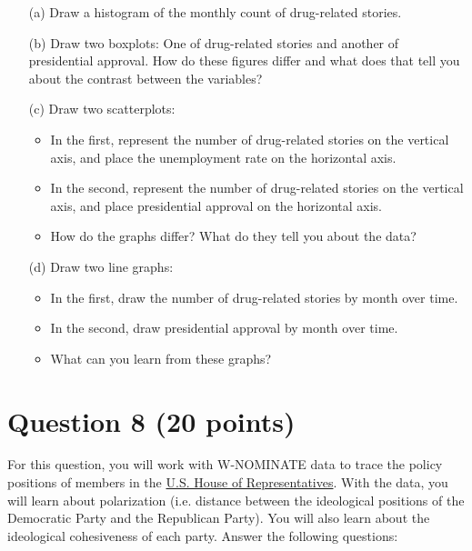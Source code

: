 \documentclass[12pt,letterpaper]{article}
\begin{document}
\begin{itemize}

\item[(a)]  Draw a histogram of the monthly count of drug-related stories. \\

\item[(b)] Draw two boxplots: One of drug-related stories and another of presidential approval. How do these figures differ and what does that tell you about the contrast between the variables? \\

\item[(c)]  Draw two scatterplots:
\begin{itemize}
\item In the first, represent the number of drug-related stories on the vertical axis, and place the unemployment rate on the horizontal axis.
\item In the second, represent the number of drug-related stories on the vertical axis, and place presidential approval on the horizontal axis.
\item How do the graphs differ? What do they tell you about the data? \\
\end{itemize}

\item[(d)]  Draw two line graphs:
\begin{itemize}
\item In the first, draw the number of drug-related stories by month over time.
\item In the second, draw presidential approval by month over time.
\item What can you learn from these graphs? \\
\end{itemize}


\end{itemize}

\section*{Question 8 (20 points)}
For this question, you will work with W-NOMINATE data to trace the policy positions of members in the \href{https://drive.google.com/open?id=1kVn-Asz8KXPQhiLSQGEabdVJh9_8_wjf}{U.S. House of Representatives}. With the data, you will learn about polarization (i.e. distance between the ideological positions of the Democratic Party and the Republican Party). You will also learn about the ideological cohesiveness of each party. Answer the following questions:\\
\end{document}
